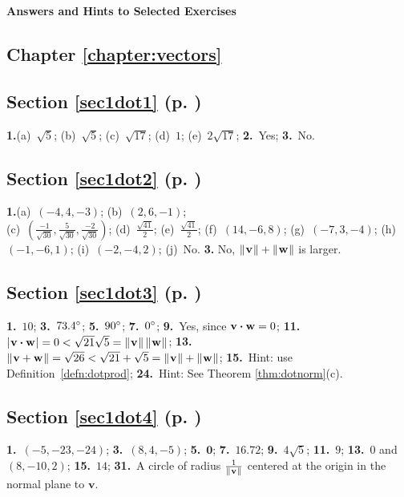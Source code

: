 \textsf{\textbf{\Large Answers and Hints to Selected Exercises}}
\begin{multicols}{2}
\section*{Chapter \ref{chapter:vectors}}
\subsection*{Section \ref{sec1dot1} (p. \pageref{sec1dot1})}
\textbf{1.}(a)~$\sqrt{5}$;\quad 
(b)~$\sqrt{5}$;\quad 
(c)~$\sqrt{17}$;\quad 
(d)~$1$;\quad
(e)~$2 \sqrt{17}$;\quad 
\textbf{2.}~Yes;\quad 
\textbf{3.}~No.
\subsection*{Section \ref{sec1dot2} (p. \pageref{sec1dot2})}
\textbf{1.}(a)~$(-4,4,-3)$;\quad 
(b)~$(2,6,-1)$;\\
(c)~$\left ( \frac{-1}{\sqrt{30}},\frac{5}{\sqrt{30}},
\frac{-2}{\sqrt{30}}\right )$;\quad 
(d)~$\frac{\sqrt{41}}{2}$;\quad 
(e)~$\frac{\sqrt{41}}{2}$;\quad
(f)~$(14,-6,8)$;\quad
(g)~$(-7,3,-4)$;\quad
(h)~$(-1,-6,1)$;\quad 
(i)~$(-2,-4,2)$;\quad 
(j)~No.\quad
\textbf{3.} No, $\lVert\mspace{1mu}\textbf{v}\mspace{1mu}\rVert +
\lVert\mspace{1mu}\textbf{w}\mspace{1mu}\rVert$ is larger.

\subsection*{Section \ref{sec1dot3} (p. \pageref{sec1dot3})}
\textbf{1.}~$10$;\quad 
\textbf{3.}~$73.4^\circ$;\quad 
\textbf{5.}~$90^\circ$;\quad 
\textbf{7.}~$0^\circ$;\quad
\textbf{9.}~Yes, since $\textbf{v} \bm{\cdot} \textbf{w} = 0$;\quad
\textbf{11.}~$\lvert\mspace{1mu}\textbf{v} \bm{\cdot} \textbf{w}\mspace{1mu}\rvert =
0 < \sqrt{21}\sqrt{5} = \lVert\mspace{1mu}\textbf{v}\mspace{1mu}\rVert\,\lVert\mspace{1mu}\textbf{w}\mspace{1mu}\rVert$;\quad
\textbf{13.}~$\lVert\mspace{1mu}\textbf{v} + \textbf{w}\mspace{1mu}\rVert = \sqrt{26}
< \sqrt{21} + \sqrt{5} = \lVert\mspace{1mu}\textbf{v}\mspace{1mu}\rVert + \lVert\mspace{1mu}\textbf{w}\mspace{1mu}\rVert$;
\textbf{15.}~Hint: use Definition~\ref{defn:dotprod};\quad
\textbf{24.}~Hint: See Theorem \ref{thm:dotnorm}(c).

\subsection*{Section \ref{sec1dot4} (p. \pageref{sec1dot4})}
\textbf{1.}~$(-5,-23,-24)$;\quad 
\textbf{3.}~$(8,4,-5)$;\quad 
\textbf{5.}~$\textbf{0}$;\quad
\textbf{7.}~$16.72$;\quad
\textbf{9.}~$4\sqrt{5}$;\quad 
\textbf{11.}~$9$;\quad 
\textbf{13.}~$0$ and $(8,-10,2)$;\quad 
\textbf{15.}~$14$;\quad
\textbf{31.}~A circle of radius $\tfrac1{\lVert\mspace{1mu}\mathbf{v}\mspace{1mu}\rVert}$ centered at the origin in the normal plane to $\mathbf{v}$. 


\end{multicols}
